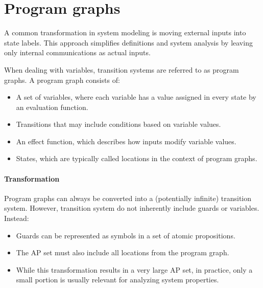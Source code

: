 \section{Program graphs}

A common transformation in system modeling is moving external inputs into state labels. 
This approach simplifies definitions and system analysis by leaving only internal communications as actual inputs.

When dealing with variables, transition systems are referred to as program graphs. 
A program graph consists of:
\begin{itemize}
    \item A set of variables, where each variable has a value assigned in every state by an evaluation function.
    \item Transitions that may include conditions based on variable values.
    \item An effect function, which describes how inputs modify variable values.
    \item States, which are typically called locations in the context of program graphs.
\end{itemize}

\paragraph*{Transformation}
Program graphs can always be converted into a (potentially infinite) transition system.
However, transition system do not inherently include guards or variables. 
Instead:
\begin{itemize}
    \item Guards can be represented as symbols in a set of atomic propositions.
    \item The AP set must also include all locations from the program graph.
    \item While this transformation results in a very large AP set, in practice, only a small portion is usually relevant for analyzing system properties.
\end{itemize}